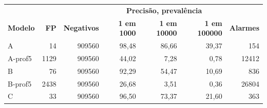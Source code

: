 \begin{tabular}{lrrrrrr}
\hline
\multicolumn{3}{c}{\textbf{}} & \multicolumn{3}{c}{\textbf{Precisão, prevalência}} & \multicolumn{1}{c}{\textbf{}} \\
\textbf{Modelo} & \textbf{FP} & \textbf{Negativos} & \textbf{1 em 1000} & \textbf{1 em 10000} & \textbf{1 em 100000} & \textbf{Alarmes} \\ \hline
A & 14 & 909560 & 98,48 & 86,66 & 39,37 & 154 \\
A-prof5 & 1129 & 909560 & 44,02 & 7,28 & 0,78 & 12412 \\
B & 76 & 909560 & 92,29 & 54,47 & 10,69 & 836 \\
B-prof5 & 2438 & 909560 & 26,68 & 3,51 & 0,36 & 26804 \\
C & 33 & 909560 & 96,50 & 73,37 & 21,60 & 363 \\
\hline
\end{tabular}
